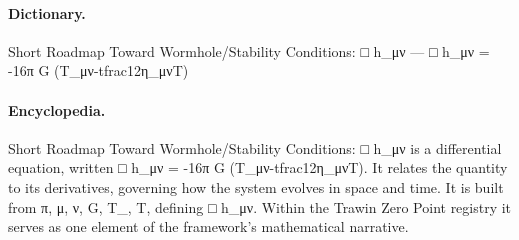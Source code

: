 \paragraph{Dictionary.}
Short Roadmap Toward Wormhole/Stability Conditions: □ h\_μν — □ h\_μν = -16π G (T\_μν-tfrac12η\_μνT)

\paragraph{Encyclopedia.}
Short Roadmap Toward Wormhole/Stability Conditions: □ h\_μν is a differential equation, written □ h\_μν = -16π G (T\_μν-tfrac12η\_μνT). It relates the quantity to its derivatives, governing how the system evolves in space and time. It is built from π, μ, ν, G, T\_, T, defining □ h\_μν. Within the Trawin Zero Point registry it serves as one element of the framework's mathematical narrative.
